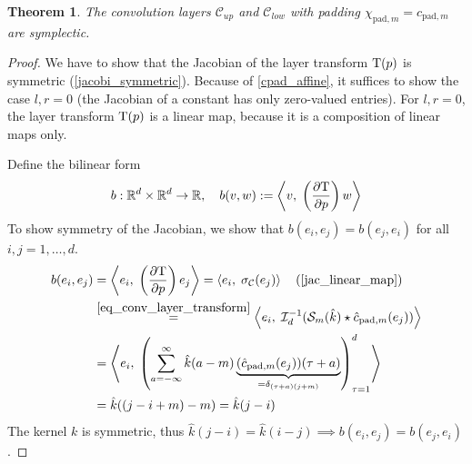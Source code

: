 \documentclass[twoside,a4paper]{article}
\newtheorem{theorem}{Theorem}
\begin{document}
\begin{theorem}\label{thm_conv_const_pad_symplectic}
	The convolution layers $\mathcal{C}_{up}$ and $\mathcal{C}_{low}$
	with padding $\chi_{\text{pad},m} = c_{\text{pad},m}$ are symplectic.
\end{theorem}
\begin{proof}
	We have to show that the Jacobian of the layer transform $\mathrm{T}(p)$
	is symmetric (\cref{jacobi_symmetric}).
	Because of \cref{cpad_affine}, it suffices to show the case $l,r=0$ (the Jacobian
	of a constant has only zero-valued entries). For $l,r=0$, the layer transform 
	$\mathrm{T}(p)$ 
	is a linear map, because it is a composition of linear maps only.

	Define the bilinear form
	\begin{equation}\label{eq_bilinear_proof_conv}
		b : \mathbb{R}^d \times \mathbb{R}^d \to \mathbb{R},
		\quad b(v,w) := \left\langle v,\; \left( \frac{\partial \mathrm{T}}{\partial p} \right) w \right\rangle
	\end{equation}
	To show symmetry of the Jacobian, we show that 
	$b(e_i, e_j) = b(e_j, e_i)$ for all $i,j=1,\dots,d$.
	\begin{align*}
		b(e_i, e_j) &= \ip{e_i}{\lb \jac{\layertf}{p} \rb e_j}
		= \ip{e_i}{\activation_{\mathcal{C}}(e_j)} \quad \text{(\cref{jac_linear_map})} \\
		&\stackrel{\cref{eq_conv_layer_transform}}{=} \ip{e_i}{\mathcal{I}_{d}^{-1} (
			\mathcal{S}_{m}(\hat{k}) \star \hat{c}_{\text{pad},m}(e_j)
		)} \\
		&= \ip{e_i}{
			\lb \sum_{a=-\infty}^{\infty} 
				\hat{k}(a-m)
				\underbrace{(\hat{c}_{\text{pad},m}(e_j))(\tau+a)}_{
					= \delta_{(\tau+a) (j+m)}
				}
			\rb_{\tau=1}^d
		} \\
		&= \hat{k}((j-i+m)-m) = \hat{k}(j-i)
	\end{align*}
	The kernel $k$ is symmetric, thus $\hat{k}(j-i) = \hat{k}(i-j) \implies b(e_i, e_j) = b(e_j,e_i)$.
\end{proof}
\end{document}
